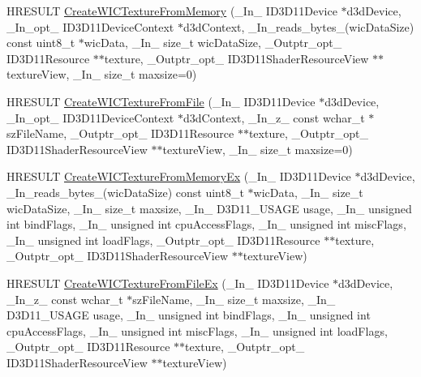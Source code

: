 \begin{DoxyCompactItemize}
\item 
H\+R\+E\+S\+U\+LT \hyperlink{namespace_direct_x_afe67970a867e51ea4f153cf50cd68f86}{Create\+W\+I\+C\+Texture\+From\+Memory} (\+\_\+\+In\+\_\+ I\+D3\+D11\+Device $\ast$d3d\+Device, \+\_\+\+In\+\_\+opt\+\_\+ I\+D3\+D11\+Device\+Context $\ast$d3d\+Context, \+\_\+\+In\+\_\+reads\+\_\+bytes\+\_\+(wic\+Data\+Size) const uint8\+\_\+t $\ast$wic\+Data, \+\_\+\+In\+\_\+ size\+\_\+t wic\+Data\+Size, \+\_\+\+Outptr\+\_\+opt\+\_\+ I\+D3\+D11\+Resource $\ast$$\ast$texture, \+\_\+\+Outptr\+\_\+opt\+\_\+ I\+D3\+D11\+Shader\+Resource\+View $\ast$$\ast$texture\+View, \+\_\+\+In\+\_\+ size\+\_\+t maxsize=0)
\item 
H\+R\+E\+S\+U\+LT \hyperlink{namespace_direct_x_a8907d700dcbb64e9a172ac986ade4877}{Create\+W\+I\+C\+Texture\+From\+File} (\+\_\+\+In\+\_\+ I\+D3\+D11\+Device $\ast$d3d\+Device, \+\_\+\+In\+\_\+opt\+\_\+ I\+D3\+D11\+Device\+Context $\ast$d3d\+Context, \+\_\+\+In\+\_\+z\+\_\+ const wchar\+\_\+t $\ast$sz\+File\+Name, \+\_\+\+Outptr\+\_\+opt\+\_\+ I\+D3\+D11\+Resource $\ast$$\ast$texture, \+\_\+\+Outptr\+\_\+opt\+\_\+ I\+D3\+D11\+Shader\+Resource\+View $\ast$$\ast$texture\+View, \+\_\+\+In\+\_\+ size\+\_\+t maxsize=0)
\item 
H\+R\+E\+S\+U\+LT \hyperlink{namespace_direct_x_a6f07a913b5f44a124de427d73afea1a4}{Create\+W\+I\+C\+Texture\+From\+Memory\+Ex} (\+\_\+\+In\+\_\+ I\+D3\+D11\+Device $\ast$d3d\+Device, \+\_\+\+In\+\_\+reads\+\_\+bytes\+\_\+(wic\+Data\+Size) const uint8\+\_\+t $\ast$wic\+Data, \+\_\+\+In\+\_\+ size\+\_\+t wic\+Data\+Size, \+\_\+\+In\+\_\+ size\+\_\+t maxsize, \+\_\+\+In\+\_\+ D3\+D11\+\_\+\+U\+S\+A\+GE usage, \+\_\+\+In\+\_\+ unsigned int bind\+Flags, \+\_\+\+In\+\_\+ unsigned int cpu\+Access\+Flags, \+\_\+\+In\+\_\+ unsigned int misc\+Flags, \+\_\+\+In\+\_\+ unsigned int load\+Flags, \+\_\+\+Outptr\+\_\+opt\+\_\+ I\+D3\+D11\+Resource $\ast$$\ast$texture, \+\_\+\+Outptr\+\_\+opt\+\_\+ I\+D3\+D11\+Shader\+Resource\+View $\ast$$\ast$texture\+View)
\item 
H\+R\+E\+S\+U\+LT \hyperlink{namespace_direct_x_af2065bbcfa2e7f066de9583dc7c3c61d}{Create\+W\+I\+C\+Texture\+From\+File\+Ex} (\+\_\+\+In\+\_\+ I\+D3\+D11\+Device $\ast$d3d\+Device, \+\_\+\+In\+\_\+z\+\_\+ const wchar\+\_\+t $\ast$sz\+File\+Name, \+\_\+\+In\+\_\+ size\+\_\+t maxsize, \+\_\+\+In\+\_\+ D3\+D11\+\_\+\+U\+S\+A\+GE usage, \+\_\+\+In\+\_\+ unsigned int bind\+Flags, \+\_\+\+In\+\_\+ unsigned int cpu\+Access\+Flags, \+\_\+\+In\+\_\+ unsigned int misc\+Flags, \+\_\+\+In\+\_\+ unsigned int load\+Flags, \+\_\+\+Outptr\+\_\+opt\+\_\+ I\+D3\+D11\+Resource $\ast$$\ast$texture, \+\_\+\+Outptr\+\_\+opt\+\_\+ I\+D3\+D11\+Shader\+Resource\+View $\ast$$\ast$texture\+View)

\end{DoxyCompactItemize}
